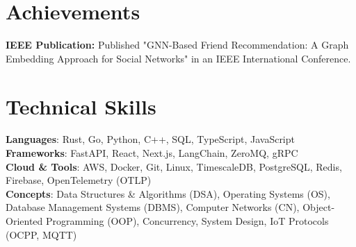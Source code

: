 \documentclass[letterpaper,11pt]{article}
\begin{document}
\section{Achievements}
 \begin{itemize}[leftmargin=0.15in, label={}]
    \small{\item{
     \textbf{IEEE Publication:} Published "GNN-Based Friend Recommendation: A Graph Embedding Approach for Social Networks" in an IEEE International Conference.
    }}
 \end{itemize}


\section{Technical Skills}
 \begin{itemize}[leftmargin=0.15in, label={}]
    \small{\item{
     \textbf{Languages}{: Rust, Go, Python, C++, SQL, TypeScript, JavaScript} \\
     \textbf{Frameworks}{: FastAPI, React, Next.js, LangChain, ZeroMQ, gRPC} \\
     \textbf{Cloud \& Tools}{: AWS, Docker, Git, Linux, TimescaleDB, PostgreSQL, Redis, Firebase, OpenTelemetry (OTLP)} \\
     \textbf{Concepts}{: Data Structures \& Algorithms (DSA), Operating Systems (OS), Database Management Systems (DBMS), Computer Networks (CN), Object-Oriented Programming (OOP), Concurrency, System Design, IoT Protocols (OCPP, MQTT)}
    }}
 \end{itemize}



\end{document}
